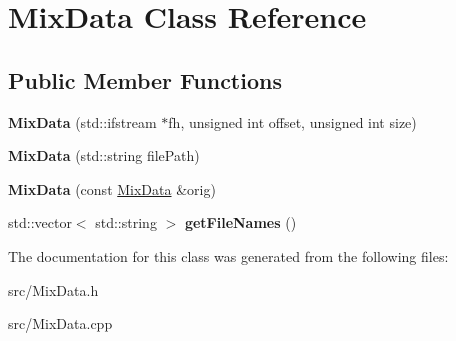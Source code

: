 \hypertarget{class_mix_data}{
\section{MixData Class Reference}
\label{class_mix_data}
}
\subsection*{Public Member Functions}
\begin{DoxyCompactItemize}
\item 
\hypertarget{class_mix_data_a1ac379ac4eeec4566c6493f928f70199}{
{\bfseries MixData} (std::ifstream $\ast$fh, unsigned int offset, unsigned int size)}
\label{class_mix_data_a1ac379ac4eeec4566c6493f928f70199}

\item 
\hypertarget{class_mix_data_aa8af0537fa986954b7cd4fa3b18777b3}{
{\bfseries MixData} (std::string filePath)}
\label{class_mix_data_aa8af0537fa986954b7cd4fa3b18777b3}

\item 
\hypertarget{class_mix_data_afd65675bc9b27ef0c7abc5e3eecf21c6}{
{\bfseries MixData} (const \hyperlink{class_mix_data}{MixData} \&orig)}
\label{class_mix_data_afd65675bc9b27ef0c7abc5e3eecf21c6}

\item 
\hypertarget{class_mix_data_acdd8498b05a4e811d44eca5fad5be5ba}{
std::vector$<$ std::string $>$ {\bfseries getFileNames} ()}
\label{class_mix_data_acdd8498b05a4e811d44eca5fad5be5ba}

\end{DoxyCompactItemize}


The documentation for this class was generated from the following files:\begin{DoxyCompactItemize}
\item 
src/MixData.h\item 
src/MixData.cpp\end{DoxyCompactItemize}

